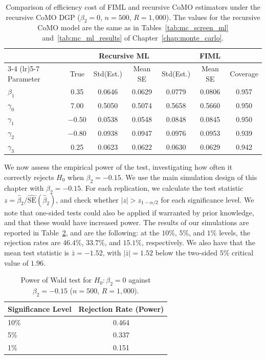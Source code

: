 \begin{table}[htbp]
\centering
\caption[Efficiency cost of FIML vs.\ recursive estimators under the recursive DGP]{Comparison of efficiency cost of FIML and recursive CoMO estimators under the recursive CoMO DGP ($\beta_2 = 0$, $n = 500$, $R = 1{,}000$). The values for the recursive CoMO model are the same as in Tables~\ref{tab:mc_screen_ml} and~\ref{tab:mc_ml_results} of Chapter~\ref{chap:monte_carlo}.}
\label{tab:mc_simul_efficiency}
\begin{tabular}{lcccccc}
\toprule
& & \multicolumn{2}{c}{Recursive ML} & \multicolumn{3}{c}{FIML} \\
\cmidrule(lr){3-4} \cmidrule(lr){5-7}
Parameter & True & Std(Est.) & Mean SE & Std(Est.) & Mean SE & Coverage \\
\midrule
$\beta_1$    &  0.35 & 0.0646 & 0.0629 & 0.0779 & 0.0806 & 0.957 \\
$\gamma_0$   &  7.00 & 0.5050 & 0.5074 & 0.5658 & 0.5660 & 0.950 \\
$\gamma_1$   & $-0.50$ & 0.0538 & 0.0548 & 0.0848 & 0.0845 & 0.950 \\
$\gamma_2$   & $-0.80$ & 0.0938 & 0.0947 & 0.0976 & 0.0953 & 0.939 \\
$\gamma_3$   &  0.25 & 0.0623 & 0.0622 & 0.0630 & 0.0629 & 0.942 \\
\bottomrule
\end{tabular}
\end{table}

We now assess the empirical power of the test, investigating how often it correctly rejects $H_0$ when $\beta_2 = -0.15$. We use the main simulation design of this chapter with $\beta_2 = -0.15$. For each replication, we calculate the test statistic $z = \hat{\beta}_2 / \widehat{\text{SE}}(\hat\beta_2)$, and check whether $|z| > z_{1-\alpha/2}$ for each significance level. We note that one-sided tests could also be applied if warranted by prior knowledge, and that these would have increased power. The results of our simulations are reported in Table~\ref{tab:mc_wald_power}, and are the following: at the $10\%$, $5\%$, and $1\%$ levels, the rejection rates are $46.4\%$, $33.7\%$, and $15.1\%$, respectively. We also have that the mean test statistic is $\bar{z} = -1.52$, with $|\bar{z}| = 1.52$ below the two-sided $5\%$ critical value of $1.96$.

\begin{table}[htbp]
\centering
\caption[Power of Wald test for $H_0: \beta_2 = 0$ against $\beta_2 = -0.15$]{Power of Wald test for $H_0: \beta_2 = 0$ against $\beta_2 = -0.15$ ($n = 500$, $R = 1{,}000$).}
\label{tab:mc_wald_power}
\begin{tabular}{lc}
\toprule
Significance Level & Rejection Rate (Power) \\
\midrule
10\% & 0.464 \\
5\% & 0.337 \\
1\% & 0.151 \\
\bottomrule
\end{tabular}
\end{table}

